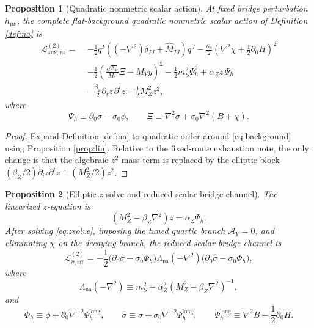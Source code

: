\documentclass[11pt]{article}
\newcommand{\AY}{\mathcal A_Y}
\newtheorem{proposition}{Proposition}
\begin{document}
\begin{proposition}[Quadratic nonmetric scalar action]
\label{prop:quad}
At fixed bridge perturbation \(h_{\mu\nu}\), the complete flat-background quadratic nonmetric scalar action of Definition \ref{def:na} is
\begin{align}
\mathcal L_{\mathrm{aux,na}}^{(2)}
=\;&
-\frac12 q^I\!\left((-\nabla^2)\delta_{IJ}+\widehat M_{IJ}\right)\!q^J
-\frac{\kappa_\theta}{2}
\left(
\nabla^2\chi+\frac12\partial_0H
\right)^2
\nonumber\\
&-\frac12
\left(
\frac{\sqrt{\lambda_4}}{M_*}\Xi-M_Yy
\right)^2
-\frac12m_S^2\Psi_h^2
+\alpha_Zz\,\Psi_h
\nonumber\\
&-\frac{\beta_Z}{2}\partial_iz\,\partial^iz
-\frac12M_Z^2z^2,
\label{eq:quad}
\end{align}
where
\begin{equation}
\Psi_h\equiv \partial_0\sigma-\sigma_0\phi,
\qquad
\Xi\equiv \nabla^2\sigma+\sigma_0\nabla^2(B+\chi).
\label{eq:quaddefs}
\end{equation}
\end{proposition}

\begin{proof}
Expand Definition \ref{def:na} to quadratic order around \eqref{eq:background} using Proposition \ref{prop:lin}. Relative to the fixed-route exhaustion note, the only change is that the algebraic \(z^2\) mass term is replaced by the elliptic block \((\beta_Z/2)\partial_i z\partial^i z+(M_Z^2/2)z^2\).
\end{proof}

\begin{proposition}[Elliptic \(z\)-solve and reduced scalar bridge channel]
\label{prop:reduction}
The linearized \(z\)-equation is
\begin{equation}
\left(M_Z^2-\beta_Z\nabla^2\right)z
=
\alpha_Z\Psi_h.
\label{eq:zsolve}
\end{equation}
After solving \eqref{eq:zsolve}, imposing the tuned quartic branch \(\AY=0\), and eliminating \(\chi\) on the decaying branch, the reduced scalar bridge channel is
\begin{equation}
\mathcal L_{\hat\sigma,\mathrm{eff}}^{(2)}
=
-\frac12
\bigl(\partial_0\hat\sigma-\sigma_0\Phi_h\bigr)
\Lambda_{\mathrm{na}}(-\nabla^2)
\bigl(\partial_0\hat\sigma-\sigma_0\Phi_h\bigr),
\label{eq:Leff}
\end{equation}
where
\begin{equation}
\Lambda_{\mathrm{na}}(-\nabla^2)
\equiv
m_S^2-\alpha_Z^2\left(M_Z^2-\beta_Z\nabla^2\right)^{-1},
\label{eq:Lambdaop}
\end{equation}
and
\begin{equation}
\Phi_h\equiv \phi+\partial_0\nabla^{-2}\Psi_{\!h}^{\mathrm{long}},
\qquad
\hat\sigma\equiv \sigma+\sigma_0\nabla^{-2}\Psi_{\!h}^{\mathrm{long}},
\qquad
\Psi_{\!h}^{\mathrm{long}}\equiv \nabla^2B-\frac12\partial_0H.
\label{eq:redefs}
\end{equation}
\end{proposition}
\end{document}
